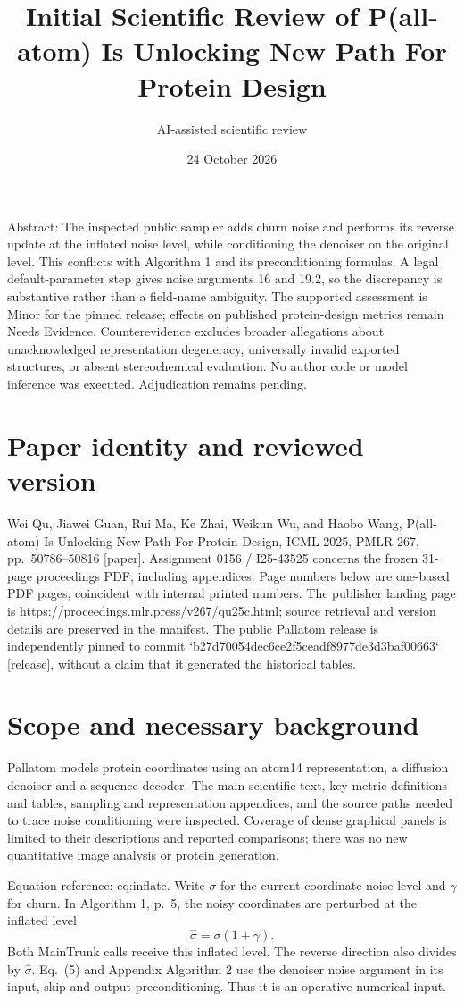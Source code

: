 \documentclass[10pt]{article}
\title{Initial Scientific Review of
P(all-atom) Is Unlocking New Path For Protein Design}
\author{AI-assisted scientific review}
\date{24 October 2026}
\begin{document}
\maketitle
Abstract: The inspected public sampler adds churn noise and performs its reverse update at the inflated noise level, while conditioning the denoiser on the original level. This conflicts with Algorithm 1 and its preconditioning formulas. A legal default-parameter step gives noise arguments 16 and 19.2, so the discrepancy is substantive rather than a field-name ambiguity. The supported assessment is Minor for the pinned release; effects on published protein-design metrics remain Needs Evidence. Counterevidence excludes broader allegations about unacknowledged representation degeneracy, universally invalid exported structures, or absent stereochemical evaluation. No author code or model inference was executed. Adjudication remains pending.\par
\section*{Paper identity and reviewed version}
Wei Qu, Jiawei Guan, Rui Ma, Ke Zhai, Weikun Wu, and Haobo Wang, P(all-atom) Is Unlocking New Path For Protein Design, ICML 2025, PMLR 267, pp. 50786–50816 [paper]. Assignment 0156 / I25-43525 concerns the frozen 31-page proceedings PDF, including appendices. Page numbers below are one-based PDF pages, coincident with internal printed numbers. The publisher landing page is https://proceedings.mlr.press/v267/qu25c.html; source retrieval and version details are preserved in the manifest. The public Pallatom release is independently pinned to commit `b27d70054dec6ce2f5ceadf8977de3d3baf00663` [release], without a claim that it generated the historical tables.\par
\section*{Scope and necessary background}
Pallatom models protein coordinates using an atom14 representation, a diffusion denoiser and a sequence decoder. The main scientific text, key metric definitions and tables, sampling and representation appendices, and the source paths needed to trace noise conditioning were inspected. Coverage of dense graphical panels is limited to their descriptions and reported comparisons; there was no new quantitative image analysis or protein generation.\par
Equation reference: eq:inflate. Write \(\sigma\) for the current coordinate noise level and \(\gamma\) for churn. In Algorithm 1, p. 5, the noisy coordinates are perturbed at the inflated level \[
\widehat{\sigma}=\sigma(1+\gamma).\] Both MainTrunk calls receive this inflated level. The reverse direction also divides by \(\widehat{\sigma}\). Eq. (5) and Appendix Algorithm 2 use the denoiser noise argument in its input, skip and output preconditioning. Thus it is an operative numerical input.\par
\end{document}
